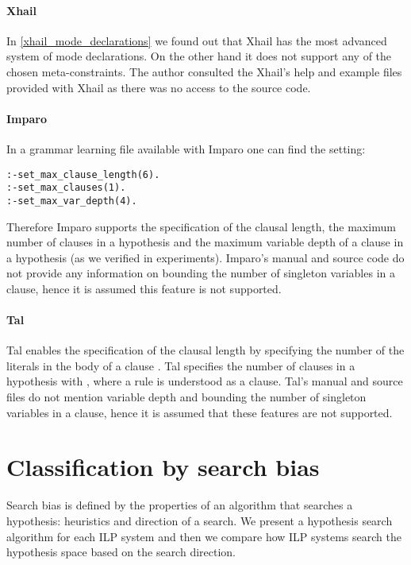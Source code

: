 \paragraph{Xhail}
In \ref{xhail_mode_declarations} we found out that Xhail has the most advanced system of mode declarations. On the other hand it does not support any of the chosen meta-constraints\cite{ray2007xhail}. The author consulted the Xhail's help and example files provided with Xhail as there was no access to the source code.

\paragraph{Imparo}
In a grammar learning file available with Imparo\cite{kimber2013imparo} one can find the setting:
\begin{lstlisting}
:-set_max_clause_length(6).
:-set_max_clauses(1).
:-set_max_var_depth(4).
\end{lstlisting}
Therefore Imparo supports the specification of the clausal length, the maximum number of clauses in a hypothesis and the maximum variable depth of a clause in a hypothesis (as we verified in experiments). Imparo's manual and source code do not provide any information on bounding the number of singleton variables in a clause, hence it is assumed this feature is not supported.

\paragraph{Tal}
Tal enables the specification of the clausal length by specifying the number of the literals in the body of a clause \cite{corapi2010inductive}. Tal specifies the number of clauses in a hypothesis with \cite{corapi2010inductive}, where a rule is understood as a clause. Tal's manual and source files do not mention variable depth and bounding the number of singleton variables in a clause, hence it is assumed that these features are not supported.

\section{Classification by search bias}\label{classification_by_search_bias}
Search bias\cite{nienhuys1997foundations} is defined by the properties of an algorithm that searches a hypothesis: heuristics and direction of a search. We present a hypothesis search algorithm for each ILP system and then 
we compare how ILP systems search the hypothesis space based on the search direction.
